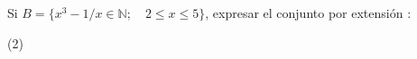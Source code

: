 \item{Si $B = \{ x^{3} - 1 / x \in \mathbb{N};\quad 2 \le x \le 5\}$, expresar el conjunto por extensión : 
\begin{tasks}(2)
\end{tasks}
}